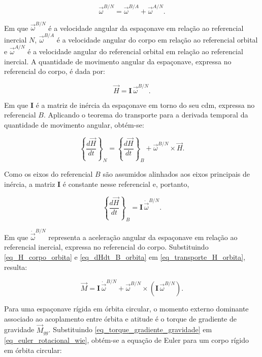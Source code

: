 \begin{equation}
\vec{\omega}^{B/N} = \vec{\omega}^{B/A} + \vec{\omega}^{A/N}.
\label{eq_omega_B_N_decomp}
\end{equation}

Em que $\vec{\omega}^{B/N}$ é a velocidade angular da espaçonave em relação ao referencial inercial $N$, $\vec{\omega}^{B/A}$ é a velocidade angular do corpo em relação ao referencial orbital e $\vec{\omega}^{A/N}$ é a velocidade angular do referencial orbital em relação ao referencial inercial.
A quantidade de movimento angular da espaçonave, expressa no referencial do corpo, é dada por:

\begin{equation}
\vec{H} = \mathbf{I}\,\vec{\omega}^{B/N}.
\label{eq_H_corpo_orbita}
\end{equation}

Em que $\mathbf{I}$ é a matriz de inércia da espaçonave em torno do seu \gls{cdm}, expressa no referencial $B$.
Aplicando o teorema do transporte para a derivada temporal da quantidade de movimento angular, obtém-se:

\begin{equation}
\left\{ \frac{d\vec{H}}{dt} \right\}_{N}
=
\left\{ \frac{d\vec{H}}{dt} \right\}_{B}
+
\vec{\omega}^{B/N}\times\vec{H}.
\label{eq_transporte_H_orbita}
\end{equation}

Como os eixos do referencial $B$ são assumidos alinhados aos eixos principais de inércia, a matriz $\mathbf{I}$ é constante nesse referencial e, portanto,

\begin{equation}
\left\{ \frac{d\vec{H}}{dt} \right\}_{B}
=
\mathbf{I}\,\dot{\vec{\omega}}^{B/N}.
\label{eq_dHdt_B_orbita}
\end{equation}

Em que $\dot{\vec{\omega}}^{B/N}$ representa a aceleração angular da espaçonave em relação ao referencial inercial, expressa no referencial do corpo.
Substituindo \eqref{eq_H_corpo_orbita} e \eqref{eq_dHdt_B_orbita} em \eqref{eq_transporte_H_orbita}, resulta:

\begin{equation}
\vec{M}
=
\mathbf{I}\,\dot{\vec{\omega}}^{B/N}
+
\vec{\omega}^{B/N}\times\left(\mathbf{I}\,\vec{\omega}^{B/N}\right).
\label{eq_euler_rotacional_wie}
\end{equation}


Para uma espaçonave rígida em órbita circular, o momento externo dominante associado ao acoplamento entre órbita e atitude é o torque de gradiente de gravidade $\vec{M}_{gg}$.
Substituindo \eqref{eq_torque_gradiente_gravidade} em \eqref{eq_euler_rotacional_wie}, obtém-se a equação de Euler para um corpo rígido em órbita circular:

